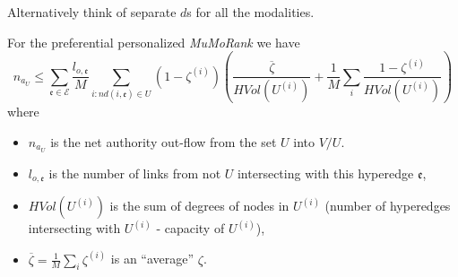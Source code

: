 \documentclass{fundam}
\newcommand{\HEM}{\mathcal{E}}
\newcommand{\hem}{\mathfrak{e}}
\newcommand{\N}{ V }
\begin{document}
Alternatively think of separate $d$s for all the modalities.
\begin{theorem} \label{thMPRlimitd0uneqzeta}
For the preferential personalized \emph{MuMoRank}
we have
$$  n_{a_U}
\le
 \sum_{\hem\in \HEM } \frac{l_{o,\hem}}{M}\sum_{i:nd(i,\hem)\in U} (1-\zeta^{(i)}) \left(  \frac{\overline{\zeta}  }{HVol(U^{(i)}) }+ \frac1M\sum_i\frac{ 1-\zeta^{(i)}    }{HVol(U^{(i)})}\right)
$$
where
\begin{itemize}
\itemsep=0.95pt
\item $n_{a_U}$ is the net authority out-flow from the  set $U$ into $\N / U$.
\item
 $l_{o,\hem}$ is the number of links from not $U$ intersecting with this hyperedge $\hem$,
\item  $HVol(U^{(i)})$ is the sum of  degrees of nodes in  $U^{(i)}$ (number of   hyperedges intersecting with  $U^{(i)}$ -  capacity of $U^{(i)}$),
\item
$\overline{\zeta}=\frac1M\sum_i \zeta^{(i)}$ is an ``average'' $\zeta$. \QED
\end{itemize}
\end{theorem}

\end{document}
